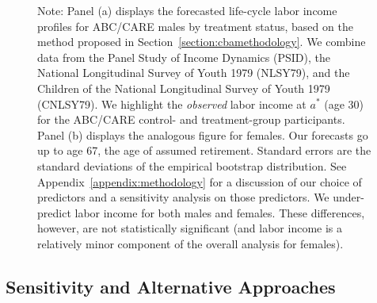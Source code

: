 \begin{figure}
Note: Panel (a) displays the forecasted life-cycle labor income profiles for ABC/CARE males by treatment status, based on the method proposed in Section~\ref{section:cbamethodology}. We combine data from the Panel Study of Income Dynamics (PSID), the National Longitudinal Survey of Youth 1979 (NLSY79), and the Children of the National Longitudinal Survey of Youth 1979 (CNLSY79). We highlight the \textit{observed} labor income at $a^*$ (age 30) for the ABC/CARE control- and treatment-group participants. Panel (b) displays the analogous figure for females. Our forecasts go up to age 67, the age of assumed retirement. Standard errors are the standard deviations of the empirical bootstrap distribution. See  Appendix~\ref{appendix:methodology} for a discussion of our choice of predictors and a sensitivity analysis on those predictors. We under-predict labor income for both males and females. These differences, however, are not statistically significant (and labor income is a relatively minor component of the overall analysis for females).
\end{figure}

\subsection{Sensitivity and Alternative Approaches} \label{section:sens}

